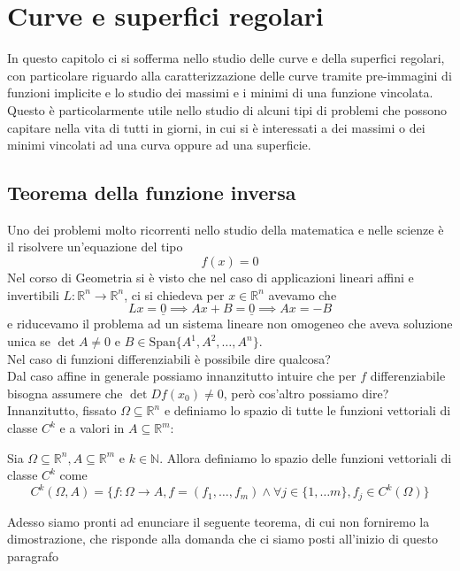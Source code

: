 \documentclass[openany, italian]{book}
\begin{document}
\chapter{Curve e superfici regolari}
In questo capitolo ci si sofferma nello studio delle curve e della superfici regolari, con particolare riguardo alla caratterizzazione delle curve tramite pre-immagini di funzioni implicite e lo studio dei massimi e i minimi di una funzione vincolata. Questo è particolarmente utile nello studio di alcuni tipi di problemi che possono capitare nella vita di tutti in giorni, in cui si è interessati a dei massimi o dei minimi vincolati ad una curva oppure ad una superficie.

\section{Teorema della funzione inversa}
Uno dei problemi molto ricorrenti nello studio della matematica e nelle scienze è il risolvere un'equazione del tipo
$$
f(x) = 0
$$
Nel corso di Geometria si è visto che nel caso di applicazioni lineari affini e invertibili $L: \mathbb{R}^n \to \mathbb{R}^n$, ci si chiedeva per $x \in \mathbb{R}^n$ avevamo che
$$
Lx = \underline{0} \implies Ax + B = \underline{0} \implies Ax = -B
$$
e riducevamo il problema ad un sistema lineare non omogeneo che aveva soluzione unica se $\det{A} \neq 0$ e $B \in \text{Span}\{ A^1, A^2, \ldots, A^n \}$. \\
Nel caso di funzioni differenziabili è possibile dire qualcosa? \\
Dal caso affine in generale possiamo innanzitutto intuire che per $f$ differenziabile bisogna assumere che $\det{Df(x_0)} \neq 0$, però cos'altro possiamo dire? \\
Innanzitutto, fissato $\Omega \subseteq \mathbb{R}^n$ e definiamo lo spazio di tutte le funzioni vettoriali di classe $C^k$ e a valori in $A \subseteq \mathbb{R}^m$:
\begin{definition}
Sia $\Omega \subseteq \mathbb{R}^n, A \subseteq \mathbb{R}^m$ e $k \in \mathbb{N}$. Allora definiamo lo spazio delle funzioni vettoriali di classe $C^k$ come
$$
C^k(\Omega,A) = \{f: \Omega \to A, f = (f_1, \ldots, f_m) \wedge \forall j \in \{1, \ldots m \}, f_j \in C^k(\Omega) \}
$$
\end{definition}
Adesso siamo pronti ad enunciare il seguente teorema, di cui non forniremo la dimostrazione, che risponde alla domanda che ci siamo posti all'inizio di questo paragrafo
\end{document}
